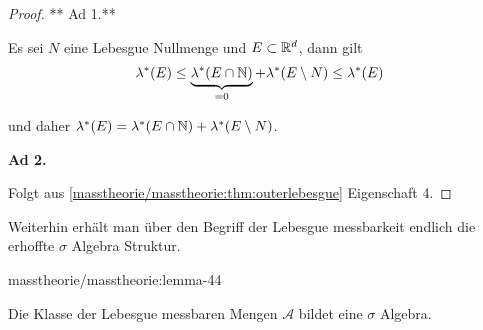 \begin{proof}
 ** Ad 1.**

\par
Es sei \(N\) eine Lebesgue Nullmenge und \(E\subset\mathbb{R}^d\), dann gilt
\begin{align*}
\lambda^\ast(E) \leq \underbrace{\lambda^\ast(E\cap\mathbb{N})}_{=0} + \lambda^\ast(E\setminus N)\leq
 \lambda^\ast(E)
\end{align*}
\par
und daher \(\lambda^\ast(E) = \lambda^\ast(E\cap\mathbb{N}) + \lambda^\ast(E\setminus N)\).

\par
\textbf{Ad 2.}

\par
Folgt aus \cref{masstheorie/masstheorie:thm:outerlebesgue} Eigenschaft 4.
\end{proof}

\par
Weiterhin erhält man über den Begriff der Lebesgue messbarkeit endlich die erhoffte \(\sigma\) Algebra Struktur.
\begin{lemma}{}{masstheorie/masstheorie:lemma-44}



\par
Die Klasse der Lebesgue messbaren Mengen \(\mathcal{A}\) bildet eine \(\sigma\) Algebra.
\end{lemma}

